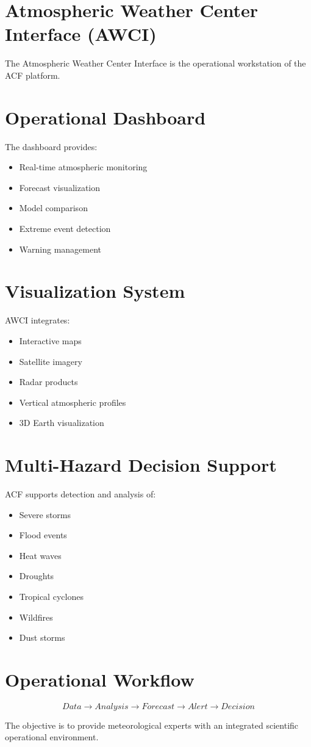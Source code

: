 \section{Atmospheric Weather Center Interface (AWCI)}

The Atmospheric Weather Center Interface is the operational
workstation of the ACF platform.


\section{Operational Dashboard}

The dashboard provides:

\begin{itemize}
\item Real-time atmospheric monitoring
\item Forecast visualization
\item Model comparison
\item Extreme event detection
\item Warning management
\end{itemize}



\section{Visualization System}

AWCI integrates:

\begin{itemize}
\item Interactive maps
\item Satellite imagery
\item Radar products
\item Vertical atmospheric profiles
\item 3D Earth visualization
\end{itemize}



\section{Multi-Hazard Decision Support}

ACF supports detection and analysis of:

\begin{itemize}
\item Severe storms
\item Flood events
\item Heat waves
\item Droughts
\item Tropical cyclones
\item Wildfires
\item Dust storms
\end{itemize}



\section{Operational Workflow}


\begin{equation}
Data
\rightarrow
Analysis
\rightarrow
Forecast
\rightarrow
Alert
\rightarrow
Decision
\end{equation}


The objective is to provide meteorological experts with an
integrated scientific operational environment.
